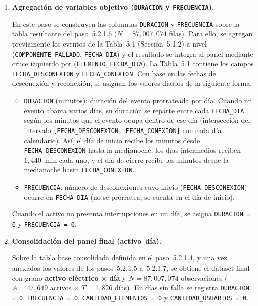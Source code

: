 {\begin{enumerate}
    \item \textbf{Agregación de variables objetivo (\texttt{DURACION} y \texttt{FRECUENCIA}).}\mbox{}\par\vspace{0.2em}\noindent
    En este paso se construyen las columnas \texttt{DURACION} y \texttt{FRECUENCIA} sobre la tabla resultante del paso~5.2.1.6 ($N = 87{,}007{,}074$ filas). Para ello, se agregan previamente los eventos de la Tabla~5.1 (Sección~5.1.2) a nivel (\texttt{COMPONENTE\_FALLADO}, \texttt{FECHA\_DIA}) y el resultado se integra al panel mediante cruce izquierdo por (\texttt{ELEMENTO}, \texttt{FECHA\_DIA}). La Tabla~5.1 contiene los campos \texttt{FECHA\_DESCONEXION} y \texttt{FECHA\_CONEXION}. Con base en las fechas de desconexión y reconexión, se asignan los valores diarios de la siguiente forma:
    \begin{itemize}
        \item \texttt{DURACION} (minutos): duración del evento prorrateada por día. Cuando un evento abarca varios días, su duración se reparte entre cada \texttt{FECHA\_DIA} según los minutos que el evento ocupa dentro de ese día (intersección del intervalo \texttt{[FECHA\_DESCONEXION, FECHA\_CONEXION]} con cada día calendario). Así, el día de inicio recibe los minutos desde \texttt{FECHA\_DESCONEXION} hasta la medianoche, los días intermedios reciben $1{,}440$~min cada uno, y el día de cierre recibe los minutos desde la medianoche hasta \texttt{FECHA\_CONEXION}.
        \item \texttt{FRECUENCIA}: número de desconexiones cuyo inicio (\texttt{FECHA\_DESCONEXION}) ocurre en \texttt{FECHA\_DIA} (no se prorratea; se cuenta en el día de inicio).
    \end{itemize}
    \noindent Cuando el activo no presenta interrupciones en un día, se asigna \texttt{DURACION = 0} y \texttt{FRECUENCIA = 0}.

    \item \textbf{Consolidación del panel final (activo--día).}\mbox{}\par\vspace{0.2em}\noindent
    Sobre la tabla base consolidada definida en el paso~5.2.1.4, y una vez anexados los valores de los pasos~5.2.1.5 a~5.2.1.7, se obtiene el dataset final con grano \textbf{activo eléctrico $\times$ día} y $N = 87{,}007{,}074$ observaciones ($A = 47{,}649$ activos $\times$ $T = 1{,}826$ días). En días sin falla se registra \texttt{DURACION = 0}, \texttt{FRECUENCIA = 0}, \texttt{CANTIDAD\_ELEMENTOS = 0} y \texttt{CANTIDAD\_USUARIOS = 0}.


\end{enumerate}}
